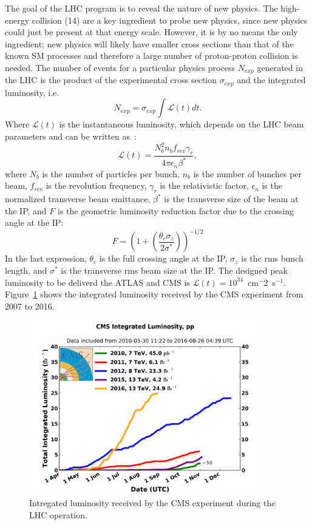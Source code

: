 The goal of the LHC program is to reveal the nature of new
physics. The high-energy collision (14\TeV) are a key ingredient to probe new
physics, since new physics could just be present at that energy
scale. However, it is by no means the only ingredient; new physics
will likely have smaller cross sections than that of the known SM
processes and therefore a large number of proton-proton collision is
needed. The number of events for a particular physics process $N_{exp}$
generated in the LHC is the product of the experimental cross section $\sigma_{exp}$
and the integrated luminosity, i.e.
\begin{equation}
N_{exp} = \sigma_{exp}\int\mathcal{L}(t)dt.
\end{equation}
Where $\mathcal{L}(t)$ is the instantaneous luminosity, which depends
on the LHC beam parameters and can be written as~\cite{LHCbeamParam}:
\begin{equation}
\mathcal{L}(t) = \frac{N^{2}_{b}n_{b}f_{rev}\gamma_{r}}{4\pi\epsilon_{n}\beta^{*}},
\end{equation}
where $N_{b}$ is the number of particles per bunch, $n_{b}$ is the
number of bunches per beam, $f_{rev}$ is the revolution frequency,
$\gamma_{r}$ is the relativistic factor, $\epsilon_{n}$ is the
normalized transverse beam emittance, $\beta^{*}$ is the transverse
size of the beam at the IP, and $F$ is the geometric luminosity
reduction factor due to the crossing angle at the IP:
\begin{equation}
F=\left(1+\left(\frac{\theta_{c}\sigma_{z}}{2\sigma^{*}}\right)\right)^{-1/2}
\end{equation}
In the last expression, $\theta_{c}$ is the full crossing angle at the
IP, $\sigma_{z}$ is the rms bunch length, and $\sigma^{*}$ is the
transverse rms beam size at the IP. The designed peak luminosity to be
deliverd the ATLAS and CMS is $\mathcal{L}(t) = 10^{34}$~cm$^-2$~s$^{-1}$.  
Figure~\ref{fig:lumi} shows the integrated luminosity
received by the CMS experiment from 2007 to 2016. 
\begin{figure}
 \centering
 \includegraphics[width=0.9\textwidth]{LHC_fig/int_lumi_cumulative_pp_2.png}
 \caption{Intregated luminosity received by the CMS experiment during the LHC operation.\label{fig:lumi} }
\end{figure}
